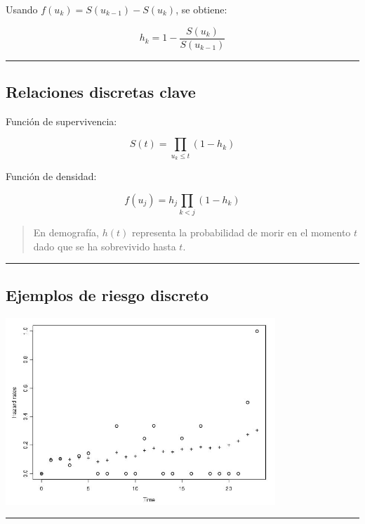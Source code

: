 \documentclass[
  letterpaper,
  DIV=11,
  numbers=noendperiod]{scrartcl}
\begin{document}
Usando \(f(u_k) = S(u_{k-1}) - S(u_k)\), se obtiene:

\[
h_k = 1 - \frac{S(u_k)}{S(u_{k-1})}
\]

\begin{center}\rule{0.5\linewidth}{0.5pt}\end{center}

\subsection{Relaciones discretas
clave}\label{relaciones-discretas-clave}

Función de supervivencia:

\[
S(t) = \prod_{u_k \le t} (1 - h_k)
\]

Función de densidad:

\[
f(u_j) = h_j \prod_{k<j} (1 - h_k)
\]

\begin{quote}
En demografía, \(h(t)\) representa la probabilidad de morir en el
momento \(t\) dado que se ha sobrevivido hasta \(t\).
\end{quote}

\begin{center}\rule{0.5\linewidth}{0.5pt}\end{center}

\subsection{Ejemplos de riesgo
discreto}\label{ejemplos-de-riesgo-discreto}

\begin{center}
\includegraphics[width=4in,height=\textheight,keepaspectratio]{figura/ejempRiesgoDiscreto.jpg}
\end{center}

\begin{center}\rule{0.5\linewidth}{0.5pt}\end{center}
\end{document}

